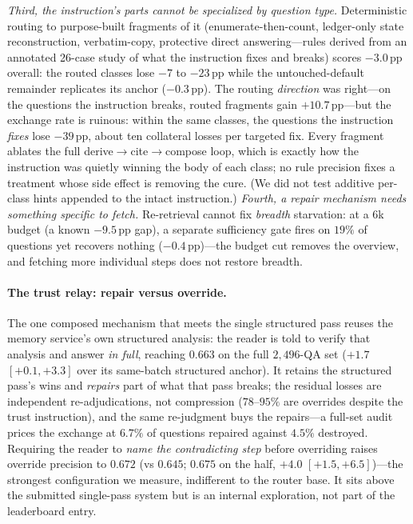 \documentclass{article} %
\newcommand{\pp}{\,\mathrm{pp}}
\begin{document}
\emph{Third, the instruction's parts cannot be specialized by question type.}
Deterministic routing to purpose-built fragments of it (enumerate-then-count,
ledger-only state reconstruction, verbatim-copy, protective direct
answering---rules derived from an annotated 26-case study of what the
instruction fixes and breaks) scores $-3.0\pp$ overall: the routed classes
lose $-7$ to $-23\pp$ while the untouched-default remainder replicates its
anchor ($-0.3\pp$). The routing \emph{direction} was right---on the questions
the instruction breaks, routed fragments gain $+10.7\pp$---but the exchange
rate is ruinous: within the same classes, the questions the instruction
\emph{fixes} lose $-39\pp$, about ten collateral losses per targeted fix.
Every fragment ablates the full derive$\to$cite$\to$compose loop, which is
exactly how the instruction was quietly winning the body of each class; no
rule precision fixes a treatment whose side effect is removing the cure. (We
did not test additive per-class hints appended to the intact instruction.)
\emph{Fourth, a repair mechanism needs something specific to fetch.}
Re-retrieval cannot fix \emph{breadth} starvation: at a 6k budget (a known
$-9.5\pp$ gap), a separate sufficiency gate fires on $19\%$ of questions yet
recovers nothing ($-0.4\pp$)---the budget cut removes the overview, and
fetching more individual steps does not restore breadth.

\paragraph{The trust relay: repair versus override.}
The one composed mechanism that meets the single structured pass reuses the memory
service's own structured analysis: the reader is told to verify that analysis and
answer \emph{in full}, reaching $0.663$ on the full $2{,}496$-QA set ($+1.7$
$[+0.1,+3.3]$ over its same-batch structured anchor). It retains the structured
pass's wins and \emph{repairs} part of what that pass breaks; the residual losses
are independent re-adjudications, not compression ($78$--$95\%$ are overrides
despite the trust instruction), and the same re-judgment buys the repairs---a
full-set audit prices the exchange at $6.7\%$ of questions repaired against $4.5\%$
destroyed. Requiring the reader to \emph{name the contradicting step} before
overriding raises override precision to $0.672$ (vs $0.645$; $0.675$ on the half,
$+4.0$ $[+1.5,+6.5]$)---the strongest configuration we measure, indifferent to the
router base. It sits above the submitted single-pass system but is an internal
exploration, not part of the leaderboard entry.
\end{document}
